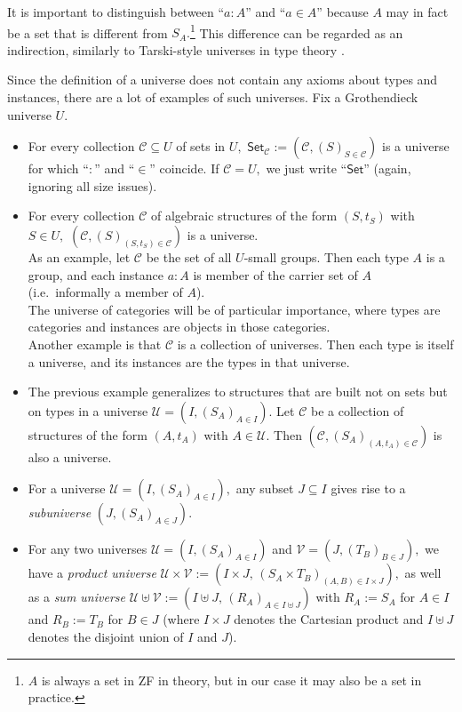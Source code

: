\documentclass[a4paper]{article}
\theoremstyle{definition}
\theoremstyle{remark}
\newcommand{\defn}{\emph}
\newcommand{\C}{\mathcal{C}}
\newcommand{\U}{\mathcal{U}}
\newcommand{\V}{\mathcal{V}}
\newcommand{\nm}{\mathsf}
\newcommand{\universe}{\nm}
\newcommand{\Set}{\universe{Set}}
\begin{document}
It is important to distinguish between ``$a : A$'' and ``$a \in A$'' because $A$ may in fact be a
set that is different from $S_A.$\footnote{$A$ is always a set in ZF in theory, but in our case it
may also be a set in practice.} This difference can be regarded as an indirection, similarly to
Tarski-style universes in type theory \cite{tarski}.

Since the definition of a universe does not contain any axioms about types and instances, there
are a lot of examples of such universes. Fix a Grothendieck universe $U.$

\begin{itemize}
  \item For every collection $\C \subseteq U$ of sets in $U,$ $\Set_\C := (\C, (S)_{S \in \C})$ is a
  universe for which ``$:$'' and ``$\in$'' coincide.
  If $\C = U,$ we just write ``$\Set$'' (again, ignoring all size issues).
  \item For every collection $\C$ of algebraic structures of the form $(S, t_S)$ with $S \in U,$
  $(\C, (S)_{(S, t_S) \in \C})$ is a universe.\\
  As an example, let $\C$ be the set of all $U$-small groups. Then each type $A$ is a group, and
  each instance $a : A$ is member of the carrier set of $A$ (i.e.\ informally a member of $A$).\\
  The universe of categories will be of particular importance, where types are categories and instances
  are objects in those categories.\\
  Another example is that $\C$ is a collection of universes. Then each type is itself a universe, and
  its instances are the types in that universe.
  \item The previous example generalizes to structures that are built not on sets but on types in a
  universe $\U = (I, (S_A)_{A \in I}).$ Let $\C$ be a collection of structures of the form $(A,t_A)$ with
  $A \in \U$. Then $(\C, (S_A)_{(A, t_A) \in \C})$ is also a universe.
  \item For a universe $\U = (I, (S_A)_{A \in I}),$ any subset $J \subseteq I$ gives rise to a
  \defn{subuniverse} $(J, (S_A)_{A \in J}).$
  \item For any two universes $\U = (I, (S_A)_{A \in I})$ and $\V = (J, (T_B)_{B \in J}),$ we have a
  \defn{product universe} $\U \times \V := (I{\times}J,\,(S_A{\times}T_B)_{(A,B) \in I{\times}J}),$ as
  well as a \defn{sum universe} $\U \uplus \V := (I \uplus J,\,(R_A)_{A \in I \uplus J})$ with
  $R_A := S_A$ for $A \in I$ and $R_B := T_B$ for $B \in J$ (where $I \times J$ denotes the Cartesian
  product and $I \uplus J$ denotes the disjoint union of $I$ and $J$).
\end{itemize}
\end{document}

